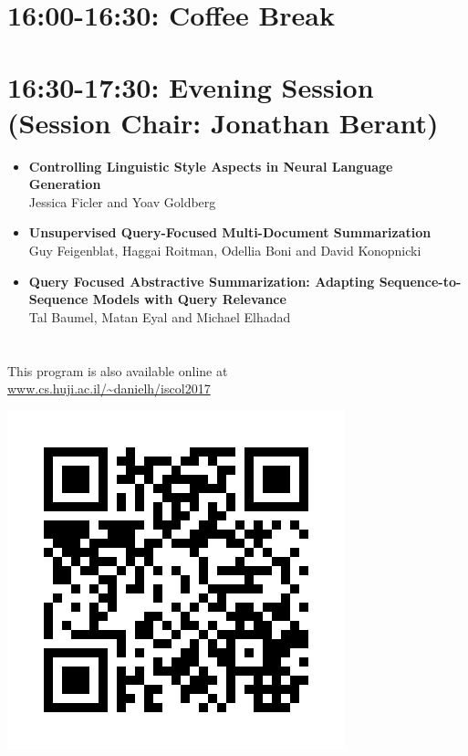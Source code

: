 \documentclass[a0,portrait]{a0poster}
\begin{document}
\begin{minipage}{.77\textwidth}
\section*{16:00-16:30: Coffee Break}

\section*{16:30-17:30: Evening Session (Session Chair: Jonathan Berant)}

\begin{itemize}
\item\LARGE
\textbf{Controlling Linguistic Style Aspects in Neural Language
Generation}\\
\Large Jessica Ficler and Yoav Goldberg
\item\LARGE
\textbf{Unsupervised Query-Focused Multi-Document Summarization}\\
\Large Guy Feigenblat, Haggai Roitman, Odellia Boni and David Konopnicki
\item\LARGE
\textbf{Query Focused Abstractive Summarization: Adapting
Sequence-to-Sequence Models with Query Relevance}\\
\Large Tal Baumel, Matan Eyal and Michael Elhadad
\end{itemize}
\end{minipage}
\hfill
\begin{minipage}{.2\textwidth}
\section*{}
\begin{flushleft}
This program is also available online at \\
\small\url{www.cs.huji.ac.il/~danielh/iscol2017}
\end{flushleft}
\hfill\includegraphics{qr_code.jpg}
\end{minipage}
\end{document}
